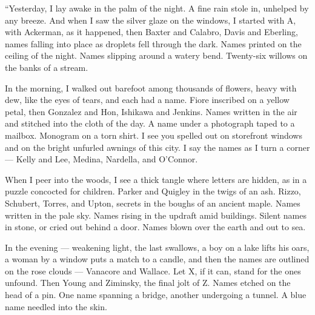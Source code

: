 \begin{itemize}
  ``Yesterday, I lay awake in the palm of the night. A fine rain stole
  in, unhelped by any breeze. And when I saw the silver glaze on the
  windows, I started with A, with Ackerman, as it happened, then Baxter
  and Calabro, Davis and Eberling, names falling into place as droplets
  fell through the dark. Names printed on the ceiling of the night.
  Names slipping around a watery bend. Twenty-six willows on the banks
  of a stream.

  In the morning, I walked out barefoot among thousands of flowers,
  heavy with dew, like the eyes of tears, and each had a name. Fiore
  inscribed on a yellow petal, then Gonzalez and Hon, Ishikawa and
  Jenkins. Names written in the air and stitched into the cloth of the
  day. A name under a photograph taped to a mailbox. Monogram on a torn
  shirt. I see you spelled out on storefront windows and on the bright
  unfurled awnings of this city. I say the names as I turn a corner ---
  Kelly and Lee, Medina, Nardella, and O'Connor.

  When I peer into the woods, I see a thick tangle where letters are
  hidden, as in a puzzle concocted for children. Parker and Quigley in
  the twigs of an ash. Rizzo, Schubert, Torres, and Upton, secrets in
  the boughs of an ancient maple. Names written in the pale sky. Names
  rising in the updraft amid buildings. Silent names in stone, or cried
  out behind a door. Names blown over the earth and out to sea.

  In the evening --- weakening light, the last swallows, a boy on a lake
  lifts his oars, a woman by a window puts a match to a candle, and then
  the names are outlined on the rose clouds --- Vanacore and Wallace.
  Let X, if it can, stand for the ones unfound. Then Young and Ziminsky,
  the final jolt of Z. Names etched on the head of a pin. One name
  spanning a bridge, another undergoing a tunnel. A blue name needled
  into the skin.


\end{itemize}
